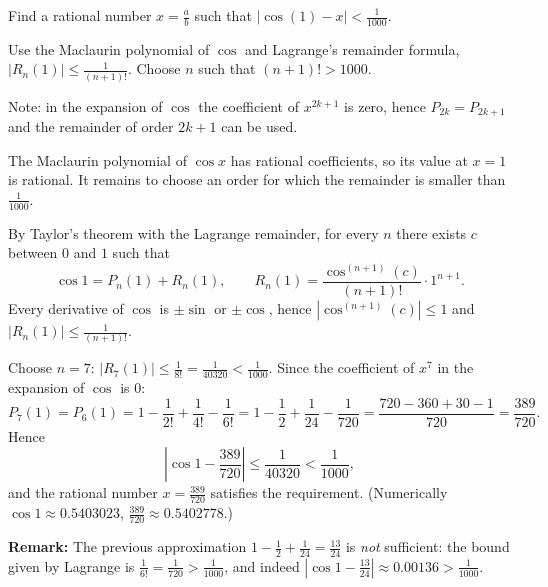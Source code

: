 
\begin{question}
Find a rational number $x=\frac ab$ such that $|\cos(1)-x|<\frac{1}{1000}$.
\end{question}

\begin{hint}
Use the Maclaurin polynomial of $\cos$ and Lagrange's remainder formula, $|R_n(1)|\le\frac{1}{(n+1)!}$. Choose $n$ such that $(n+1)!>1000$.
\end{hint}

\begin{hint}
Note: in the expansion of $\cos$ the coefficient of $x^{2k+1}$ is zero, hence $P_{2k}=P_{2k+1}$ and the remainder of order $2k+1$ can be used.
\end{hint}

\begin{solution}
The Maclaurin polynomial of $\cos x$ has rational coefficients, so its value at $x=1$ is rational. It remains to choose an order for which the remainder is smaller than $\frac1{1000}$.

By Taylor's theorem with the Lagrange remainder, for every $n$ there exists $c$ between $0$ and $1$ such that
\[ \cos1=P_n(1)+R_n(1),\qquad R_n(1)=\frac{\cos^{(n+1)}(c)}{(n+1)!}\cdot1^{n+1}. \]
Every derivative of $\cos$ is $\pm\sin$ or $\pm\cos$, hence $|\cos^{(n+1)}(c)|\le1$ and $|R_n(1)|\le\frac1{(n+1)!}$.

Choose $n=7$: $|R_7(1)|\le\frac1{8!}=\frac1{40320}<\frac1{1000}$. Since the coefficient of $x^7$ in the expansion of $\cos$ is $0$:
\[ P_7(1)=P_6(1)=1-\frac1{2!}+\frac1{4!}-\frac1{6!}=1-\frac12+\frac1{24}-\frac1{720}=\frac{720-360+30-1}{720}=\frac{389}{720}. \]
Hence
\[ \left|\cos1-\frac{389}{720}\right|\le\frac1{40320}<\frac1{1000}, \]
and the rational number $\boxed{x=\frac{389}{720}}$ satisfies the requirement. (Numerically $\cos1\approx0.5403023$, $\frac{389}{720}\approx0.5402778$.)

\textbf{Remark:} The previous approximation $1-\frac12+\frac1{24}=\frac{13}{24}$ is \emph{not} sufficient: the bound given by Lagrange is $\frac1{6!}=\frac1{720}>\frac1{1000}$, and indeed $|\cos1-\frac{13}{24}|\approx0.00136>\frac1{1000}$.
\end{solution}
